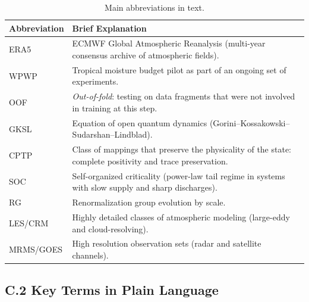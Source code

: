 \documentclass[11pt,a4paper]{article}
\theoremstyle{definition}
\theoremstyle{plain}
\theoremstyle{remark}
\begin{document}
\begin{table}[H]
\centering
\caption{Main abbreviations in text.}
\label{tab:appendix_c_abbr}
\small
\begin{tabular}{@{}p{2.8cm}p{11.2cm}@{}}
\toprule
Abbreviation & Brief Explanation \\
\midrule
ERA5 & ECMWF Global Atmospheric Reanalysis (multi-year consensus archive of atmospheric fields). \\
WPWP & Tropical moisture budget pilot as part of an ongoing set of experiments. \\
OOF & \textit{Out-of-fold}: testing on data fragments that were not involved in training at this step. \\
GKSL & Equation of open quantum dynamics (Gorini--Kossakowski--Sudarshan--Lindblad). \\
CPTP & Class of mappings that preserve the physicality of the state: complete positivity and trace preservation. \\
SOC & Self-organized criticality (power-law tail regime in systems with slow supply and sharp discharges). \\
RG & Renormalization group evolution by scale. \\
LES/CRM & Highly detailed classes of atmospheric modeling (large-eddy and cloud-resolving). \\
MRMS/GOES & High resolution observation sets (radar and satellite channels). \\
\bottomrule
\end{tabular}
\end{table}

\subsection*{C.2 Key Terms in Plain Language}
\end{document}

